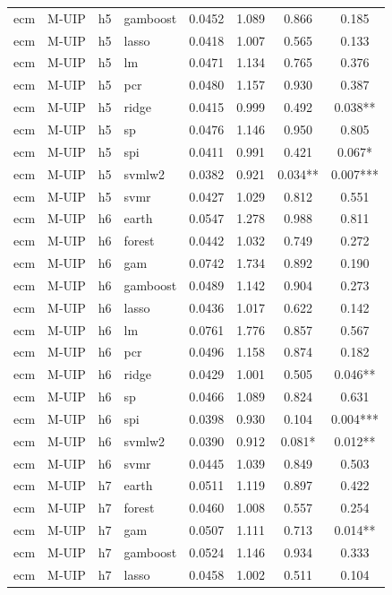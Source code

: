 \begin{ThreePartTable}
\begin{longtable}[t]{llclcccc}
ecm & M-UIP & h5 & gamboost & 0.0452 & 1.089 & 0.866 & 0.185\\
ecm & M-UIP & h5 & lasso & 0.0418 & 1.007 & 0.565 & 0.133\\
ecm & M-UIP & h5 & lm & 0.0471 & 1.134 & 0.765 & 0.376\\
ecm & M-UIP & h5 & pcr & 0.0480 & 1.157 & 0.930 & 0.387\\
ecm & M-UIP & h5 & ridge & 0.0415 & 0.999 & 0.492 & 0.038**\\
ecm & M-UIP & h5 & sp & 0.0476 & 1.146 & 0.950 & 0.805\\
ecm & M-UIP & h5 & spi & 0.0411 & 0.991 & 0.421 & 0.067*\\
ecm & M-UIP & h5 & svmlw2 & 0.0382 & 0.921 & 0.034** & 0.007***\\
ecm & M-UIP & h5 & svmr & 0.0427 & 1.029 & 0.812 & 0.551\\
\addlinespace
ecm & M-UIP & h6 & earth & 0.0547 & 1.278 & 0.988 & 0.811\\
ecm & M-UIP & h6 & forest & 0.0442 & 1.032 & 0.749 & 0.272\\
ecm & M-UIP & h6 & gam & 0.0742 & 1.734 & 0.892 & 0.190\\
ecm & M-UIP & h6 & gamboost & 0.0489 & 1.142 & 0.904 & 0.273\\
ecm & M-UIP & h6 & lasso & 0.0436 & 1.017 & 0.622 & 0.142\\
ecm & M-UIP & h6 & lm & 0.0761 & 1.776 & 0.857 & 0.567\\
ecm & M-UIP & h6 & pcr & 0.0496 & 1.158 & 0.874 & 0.182\\
ecm & M-UIP & h6 & ridge & 0.0429 & 1.001 & 0.505 & 0.046**\\
ecm & M-UIP & h6 & sp & 0.0466 & 1.089 & 0.824 & 0.631\\
ecm & M-UIP & h6 & spi & 0.0398 & 0.930 & 0.104 & 0.004***\\
ecm & M-UIP & h6 & svmlw2 & 0.0390 & 0.912 & 0.081* & 0.012**\\
ecm & M-UIP & h6 & svmr & 0.0445 & 1.039 & 0.849 & 0.503\\
\addlinespace
ecm & M-UIP & h7 & earth & 0.0511 & 1.119 & 0.897 & 0.422\\
ecm & M-UIP & h7 & forest & 0.0460 & 1.008 & 0.557 & 0.254\\
ecm & M-UIP & h7 & gam & 0.0507 & 1.111 & 0.713 & 0.014**\\
ecm & M-UIP & h7 & gamboost & 0.0524 & 1.146 & 0.934 & 0.333\\
ecm & M-UIP & h7 & lasso & 0.0458 & 1.002 & 0.511 & 0.104\\

\end{longtable}
\end{ThreePartTable}
